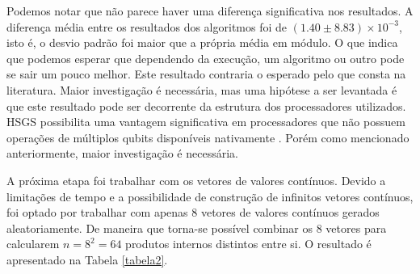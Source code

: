 \begin{table}[h!]
\caption{Discrepância para o produto interno entre vetores binários}
\label{tabela1}
\centering
{}
\end{table}

Podemos notar que não parece haver uma diferença significativa nos resultados. A diferença média entre os resultados dos algoritmos foi de $\left(1.40\pm8.83\right)\times10^{-3}$, isto é, o desvio padrão foi maior que a própria média em módulo. O que indica que podemos esperar que dependendo da execução, um algoritmo ou outro pode se sair um pouco melhor. Este resultado contraria o esperado pelo que consta na literatura. Maior investigação é necessária, mas uma hipótese a ser levantada é que este resultado pode ser decorrente da estrutura dos processadores utilizados. HSGS possibilita uma vantagem significativa em processadores que não possuem operações de múltiplos qubits disponíveis nativamente \cite{Italiano}. Porém como mencionado anteriormente, maior investigação é necessária.

A próxima etapa foi trabalhar com os vetores de valores contínuos. Devido a limitações de tempo e a possibilidade de construção de infinitos vetores contínuos, foi optado por trabalhar com apenas $8$ vetores de valores contínuos gerados aleatoriamente. De maneira que torna-se possível combinar os $8$ vetores para calcularem  $n=8^{2}=64$ produtos internos distintos entre si. O resultado  é apresentado na Tabela \ref{tabela2}.

